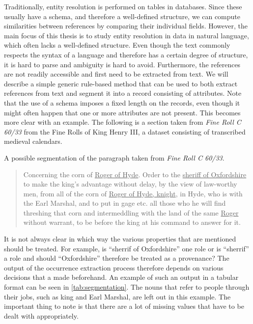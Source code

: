 Traditionally, entity resolution is performed on tables in databases.
Since these usually have a schema, and therefore a well-defined structure, we can compute similarities between references by comparing their individual fields.
However, the main focus of this thesis is to study entity resolution in data in natural language, which often lacks a well-defined structure.
Even though the text commonly respects the syntax of a language and therefore has a certain degree of structure, it is hard to parse and ambiguity is hard to avoid.
Furthermore, the references are not readily accessible and first need to be extracted from text.
We will describe a simple generic rule-based method that can be used to both extract references from text and segment it into a record consisting of attributes.
Note that the use of a schema imposes a fixed length on the records, even though it might often happen that one or more attributes are not present.
This becomes more clear with an example.
The following is a section taken from \emph{Fine Roll C 60/33}\citep{FineRolls} from the Fine Rolls of King Henry III, a dataset consisting of transcribed medieval calendars.

\begin{table}
	\centering
	
	\caption{A possible segmentation of the paragraph taken from \emph{Fine Roll C 60/33}.}
	\label{tab:segmentation}
\end{table}

\begin{quote}
	Concerning the corn of \ul{Roger of Hyde}. Order to the \ul{sheriff of Oxfordshire} to make the king’s advantage without delay, by the view of law-worthy men, from all of the corn of \ul{Roger of Hyde, knight}, in Hyde, who is with the Earl Marshal, and to put in gage etc. all those who he will find threshing that corn and intermeddling with the land of the same \ul{Roger} without warrant, to be before the king at his command to answer for it.
\end{quote}

\noindent It is not always clear in which way the various properties that are mentioned should be treated. For example, is ``sherrif of Oxfordshire'' one role or is ``sherrif'' a role and should ``Oxfordshire'' therefore be treated as a provenance? The output of the occurrence extraction process therefore depends on various decisions that a made beforehand. An example of such an output in a tabular format can be seen in \cref{tab:segmentation}.
The nouns that refer to people through their jobs, such as king and Earl Marshal, are left out in this example.
The important thing to note is that there are a lot of missing values that have to be dealt with appropriately.

